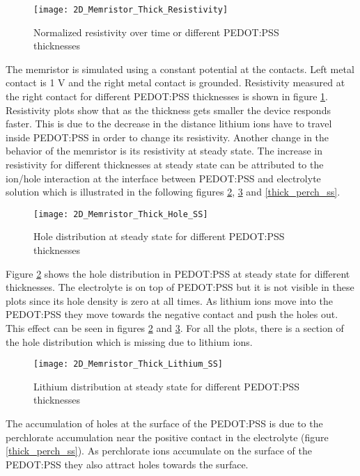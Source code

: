 \begin{doublespace}
\begin{figure}[!htp]
\centering
\texttt{[image: 2D\_Memristor\_Thick\_Resistivity]}
\caption{Normalized resistivity over time or different PEDOT:PSS thicknesses} 
\label{thick_resistivity}
\end{figure}

The memristor is simulated using a constant potential at the contacts. Left metal contact is 1 V and the right metal contact is grounded. Resistivity measured at the right contact for different PEDOT:PSS thicknesses is shown in figure \ref{thick_resistivity}. Resistivity plots show that as the thickness gets smaller the device responds faster. This is due to the decrease in the distance lithium ions have to travel inside PEDOT:PSS in order to change its resistivity. Another change in the behavior of the memristor is its resistivity at steady state. The increase in resistivity for different thicknesses at steady state can be attributed to the ion/hole interaction at the interface between PEDOT:PSS and electrolyte solution which is illustrated in the following figures \ref{thick_p_ss}, \ref{thick_li_ss} and \ref{thick_perch_ss}.

\begin{figure}[!htp]
\centering
\texttt{[image: 2D\_Memristor\_Thick\_Hole\_SS]}
\caption{Hole distribution at steady state for different PEDOT:PSS thicknesses} 
\label{thick_p_ss}
\end{figure}


Figure \ref{thick_p_ss} shows the hole distribution in PEDOT:PSS at steady state for different thicknesses. The electrolyte is on top of PEDOT:PSS but it is not visible in these plots since its hole density is zero at all times. As lithium ions move into the PEDOT:PSS they move towards the negative contact and push the holes out. This effect can be seen in figures \ref{thick_p_ss} and  \ref{thick_li_ss}. For all the plots, there is a section of the hole distribution which is missing due to lithium ions.

\begin{figure}[!htp]
\centering
\texttt{[image: 2D\_Memristor\_Thick\_Lithium\_SS]}
\caption{Lithium distribution at steady state for different PEDOT:PSS thicknesses} 
\label{thick_li_ss}
\end{figure}

The accumulation of holes at the surface of the PEDOT:PSS is due to the perchlorate accumulation near the positive contact in the electrolyte (figure \ref{thick_perch_ss}). As perchlorate ions accumulate on the surface of the PEDOT:PSS they also attract holes towards the surface.


\end{doublespace}
